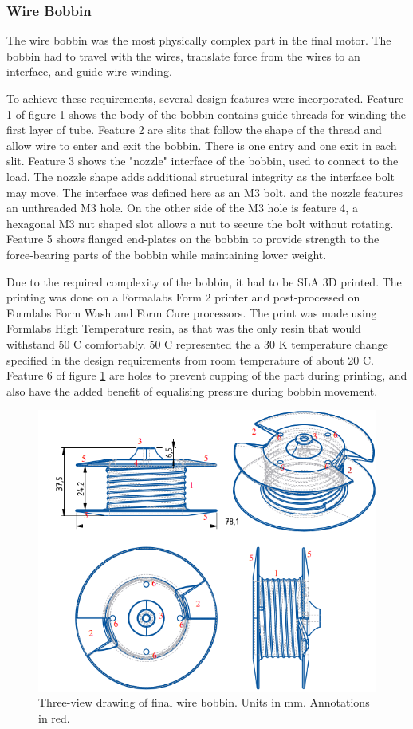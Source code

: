 \documentclass[a4paper,12pt]{article}
\begin{document}
\subsubsection{Wire Bobbin}

The wire bobbin was the most physically complex part in the final motor. The bobbin had to travel with the wires, translate force from the wires to an interface, and guide wire winding.

To achieve these requirements, several design features were incorporated. Feature 1 of figure \ref{fg:bobbin} shows the body of the bobbin contains guide threads for winding the first layer of tube. Feature 2 are slits that follow the shape of the thread and allow wire to enter and exit the bobbin. There is one entry and one exit in each slit. Feature 3 shows the "nozzle" interface of the bobbin, used to connect to the load. The nozzle shape adds additional structural integrity as the interface bolt may move. The interface was defined here as an M3 bolt, and the nozzle features an unthreaded M3 hole. On the other side of the M3 hole is feature 4, a hexagonal M3 nut shaped slot allows a nut to secure the bolt without rotating. Feature 5 shows flanged end-plates on the bobbin to provide strength to the force-bearing parts of the bobbin while maintaining lower weight.

Due to the required complexity of the bobbin, it had to be SLA 3D printed. The printing was done on a Formalabs Form 2 printer and post-processed on Formlabs Form Wash and Form Cure processors. The print was made using Formlabs High Temperature resin, as that was the only resin that would withstand 50 \degree C comfortably. 50 \degree C represented the a 30 K temperature change specified in the design requirements from room temperature of about 20 \degree C. Feature 6 of figure \ref{fg:bobbin} are holes to prevent cupping of the part during printing, and also have the added benefit of equalising pressure during bobbin movement.

\begin{figure}[h!]
    \centering
    \includegraphics[scale=0.5]{bobbin.png}
    \caption{Three-view drawing of final wire bobbin. Units in mm. Annotations in red.}
    \label{fg:bobbin}
\end{figure}
\end{document}
